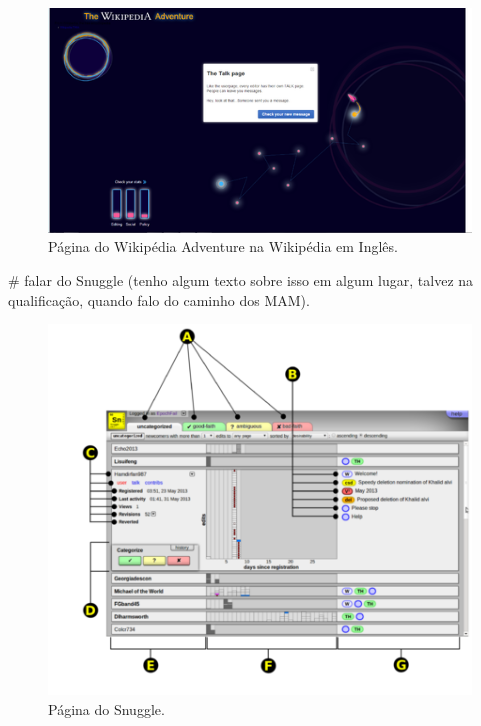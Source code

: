 \begin{figure}[H]
    \centering
    \includegraphics[width=1\textwidth]{Images/en_wikipedia_adventure.png}
    \caption{Página do Wikipédia Adventure na Wikipédia em Inglês.}
    \label{fig:wp_adventure}
\end{figure}




# falar do Snuggle (tenho algum texto sobre isso em algum lugar, talvez na qualificação, quando falo do caminho dos MAM).

\begin{figure}[H]
    \centering
    \includegraphics[width=1\textwidth]{Images/snuggle.png}
    \caption{Página do Snuggle.}
    \label{fig:snuggle}
\end{figure}


